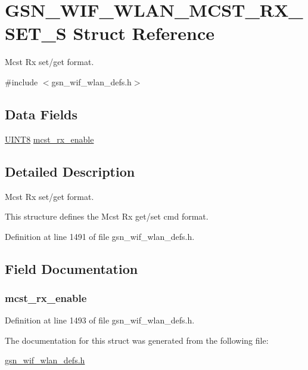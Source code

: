 \hypertarget{a00389}{
\section{GSN\_\-WIF\_\-WLAN\_\-MCST\_\-RX\_\-SET\_\-S Struct Reference}
\label{a00389}
}


Mcst Rx set/get format.  




{\ttfamily \#include $<$gsn\_\-wif\_\-wlan\_\-defs.h$>$}

\subsection*{Data Fields}
\begin{DoxyCompactItemize}
\item 
\hyperlink{a00660_gab27e9918b538ce9d8ca692479b375b6a}{UINT8} \hyperlink{a00389_ac7744431f0f3a117f5bc1ab68abbeb10}{mcst\_\-rx\_\-enable}
\end{DoxyCompactItemize}


\subsection{Detailed Description}
Mcst Rx set/get format. 

This structure defines the Mcst Rx get/set cmd format. 

Definition at line 1491 of file gsn\_\-wif\_\-wlan\_\-defs.h.



\subsection{Field Documentation}
\hypertarget{a00389_ac7744431f0f3a117f5bc1ab68abbeb10}{
\subsubsection[{mcst\_\-rx\_\-enable}]{ {\bf mcst\_\-rx\_\-enable}}}
\label{a00389_ac7744431f0f3a117f5bc1ab68abbeb10}


Definition at line 1493 of file gsn\_\-wif\_\-wlan\_\-defs.h.



The documentation for this struct was generated from the following file:\begin{DoxyCompactItemize}
\item 
\hyperlink{a00613}{gsn\_\-wif\_\-wlan\_\-defs.h}\end{DoxyCompactItemize}
